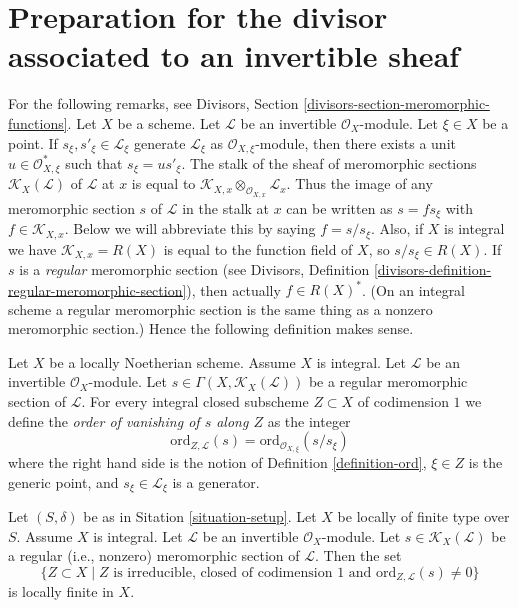 \section{Preparation for the divisor associated to an invertible sheaf}
\label{section-preparation-divisor-sheaf}

\noindent
For the following remarks, see
Divisors, Section \ref{divisors-section-meromorphic-functions}.
Let $X$ be a scheme.
Let $\mathcal{L}$ be an invertible $\mathcal{O}_X$-module.
Let $\xi \in X$ be a point.
If $s_\xi, s'_\xi \in \mathcal{L}_\xi$ generate $\mathcal{L}_\xi$
as $\mathcal{O}_{X, \xi}$-module, then there exists a unit
$u \in \mathcal{O}_{X, \xi}^*$ such that $s_\xi = u s'_\xi$.
The stalk of the sheaf of meromorphic sections
$\mathcal{K}_X(\mathcal{L})$ of $\mathcal{L}$
at $x$ is equal to
$\mathcal{K}_{X, x} \otimes_{\mathcal{O}_{X, x}} \mathcal{L}_x$.
Thus the image of any meromorphic section $s$
of $\mathcal{L}$ in the stalk at $x$ can be written as $s = fs_\xi$ with
$f \in \mathcal{K}_{X, x}$. Below we will abbreviate this by
saying $f = s/s_\xi$. Also, if $X$ is integral we have
$\mathcal{K}_{X, x} = R(X)$ is equal to the function field of $X$,
so $s/s_\xi \in R(X)$. If $s$ is a {\it regular} meromorphic
section (see
Divisors, Definition \ref{divisors-definition-regular-meromorphic-section}),
then actually $f \in R(X)^*$. (On an integral scheme a regular
meromorphic section is the same thing as a nonzero meromorphic section.)
Hence the following definition makes sense.

\begin{definition}
\label{definition-order-vanishing-meromorphic}
Let $X$ be a locally Noetherian scheme. Assume $X$ is integral.
Let $\mathcal{L}$ be an invertible $\mathcal{O}_X$-module.
Let $s \in \Gamma(X, \mathcal{K}_X(\mathcal{L}))$
be a regular meromorphic section of $\mathcal{L}$.
For every integral closed subscheme
$Z \subset X$ of codimension $1$ we define
the {\it order of vanishing of $s$ along $Z$} as the integer
$$
\text{ord}_{Z, \mathcal{L}}(s)
= \text{ord}_{\mathcal{O}_{X, \xi}}(s/s_\xi)
$$
where the right hand side is the notion of
Definition \ref{definition-ord}, $\xi \in Z$ is the generic point,
and $s_\xi \in \mathcal{L}_\xi$ is a generator.
\end{definition}

\begin{lemma}
\label{lemma-divisor-meromorphic-locally-finite}
Let $(S, \delta)$ be as in Sitation \ref{situation-setup}.
Let $X$ be locally of finite type over $S$. Assume $X$ is
integral. Let $\mathcal{L}$ be an invertible $\mathcal{O}_X$-module.
Let $s \in \mathcal{K}_X(\mathcal{L})$ be a regular (i.e., nonzero)
meromorphic section of $\mathcal{L}$. Then the set
$$
\{Z \subset X \mid Z \text{ is irreducible, closed of codimension }1
\text{ and }\text{ord}_{Z, \mathcal{L}}(s) \not = 0\}
$$
is locally finite in $X$.
\end{lemma}


